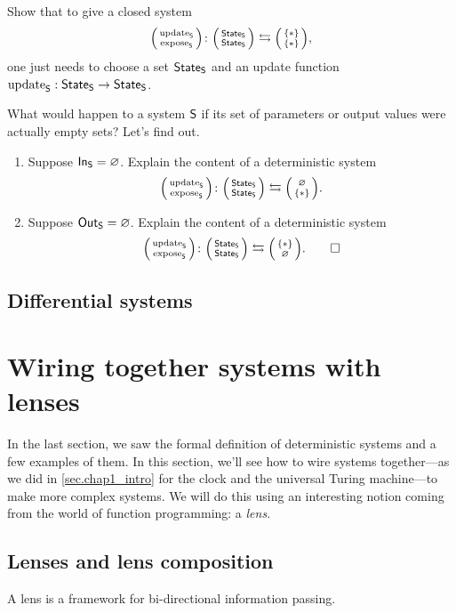 \documentclass[DynamicalBook]{subfiles}
\begin{document}
\begin{exercise}
Show that to give a closed system
\[\lens{\update{S}}{\expose{S}}\colon\lens{\State{S}}{\State{S}}\fromto\lens{\{*\}}{\{*\}},\]
one just needs to choose a set $\mathsf{State}_{\mathsf{S}}$ and an update function $\mathrm{update}_{\mathsf{S}} :  \mathsf{State}_{\mathsf{S}} \to \mathsf{State}_{\mathsf{S}}$.
\end{exercise}

\begin{exercise}
What would happen to a system $\mathsf{S}$ if its set of parameters or output values were actually empty sets? Let's find out.
\begin{enumerate}
	\item Suppose $\mathsf{In}_{\mathsf{S}}=\varnothing$. Explain the content of a deterministic system \[\lens{\update{S}}{\expose{S}}\colon\lens{\State{S}}{\State{S}}\fromto\lens{\varnothing}{\{*\}}.\]
	\item Suppose $\mathsf{Out}_{\mathsf{S}}=\varnothing$. Explain the content of a deterministic system \[\lens{\update{S}}{\expose{S}}\colon\lens{\State{S}}{\State{S}}\fromto\lens{\{*\}}{\varnothing}.
	\qedhere
\]	
\end{enumerate}
\end{exercise}



\subsection{Differential systems}


\section{Wiring together systems with lenses}\label{sec.wiring_discrete_systems}

In the last section, we saw the formal definition of deterministic systems and a
few examples of them. In this section, we'll see how to wire systems together---as we did in \cref{sec.chap1_intro} for the clock and the universal Turing machine---to
make more complex systems. We will do this using an interesting notion coming
from the world of function programming: a \emph{lens}.

\subsection{Lenses and lens composition}\label{sec.lens_discrete}

A lens is a framework for bi-directional information passing.
\end{document}
